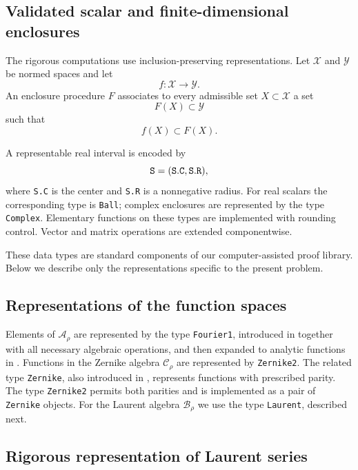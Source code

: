 \documentclass[11pt,a4paper]{amsart}
\begin{document}
\subsection{Validated scalar and finite-dimensional enclosures}

The rigorous computations use inclusion-preserving representations.
Let $\mathcal X$ and $\mathcal Y$ be normed spaces and let
\[
f:\mathcal X\longrightarrow\mathcal Y.
\]
An enclosure procedure $F$ associates to every admissible set
$X\subset\mathcal X$ a set
\[
F(X)\subset\mathcal Y
\]
such that
\[
f(X)\subset F(X).
\]

A representable real interval is encoded by
\[
{\tt S=(S.C,S.R)},
\]
where {\tt S.C} is the center and {\tt S.R} is a nonnegative radius.
For real scalars the corresponding type is {\tt Ball}; complex
enclosures are represented by the type {\tt Complex}. Elementary functions on
these types are implemented with rounding control. Vector and matrix
operations are extended componentwise.

These data types are standard components of our computer-assisted
proof library. Below we describe only the representations specific to
the present problem.


\subsection{Representations of the function spaces}

Elements of $\mathcal A_\rho$ are represented by the type
{\tt Fourier1}, introduced in \cite{ArioliKochTerracini} together with all necessary algebraic operations, and then expanded to analytic functions in \cite{ArioliKoch1}. Functions in the Zernike algebra $\mathcal C_\rho$ are represented by
{\tt Zernike2}. The related type {\tt Zernike}, also introduced in
\cite{ArioliKoch1}, represents functions with prescribed parity.
The type {\tt Zernike2} permits both parities and is implemented as a
pair of {\tt Zernike} objects.
For the Laurent algebra $\mathcal B_\rho$ we use the type
{\tt Laurent}, described next.


\subsection{Rigorous representation of Laurent series}
\label{sec:implementation-laurent}
\end{document}
